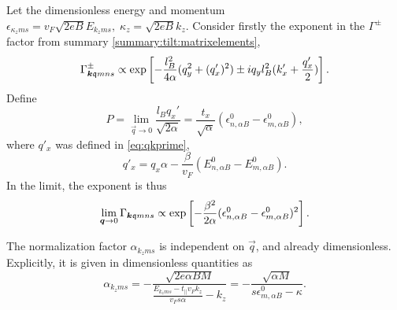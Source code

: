 Let the dimensionless energy and momentum \( \epsilon_{\kappa_z m s} = v_F \sqrt{2 e B} E_{k_{z} m s}, \; \kappa_z = \sqrt{2 e B} k_{z}  \).
Consider firstly the exponent in the \( \Gamma ^{\pm } \) factor from summary \ref{summary:tilt:matrixelements},
\[
  \Gamma^{\pm}_{\bm{k} \mathfrak{q} m n s} \propto
  \exp
  \left[
    - \frac{l_{B}^2}{4 \alpha } (q_{y}^2 + (q' _x)^2) \pm  i q_y l_B^2 (k' _x + \frac{q'_x}{2} )
  \right].
\]
Define
\begin{equation}
P = \lim_{\vec{q} \to 0} \frac{l_B q_x'}{\sqrt{2 \alpha } } = \frac{t_x}{\sqrt{\alpha}} (\epsilon^0_{n, \alpha B} - \epsilon^0_{m, \alpha B}),
\end{equation}
where \( q'_x \) was defined in \cref{eq:qkprime},
\begin{equation*}
  q' _x = q_x \alpha  - \frac{\beta}{v_{F} }( E^0_{n,\alpha B} - E^0_{m, \alpha B} ).
\end{equation*}
In the limit, the exponent is thus
\begin{equation}
  \lim_{\bm{q}\to 0} \Gamma_{\bm{k} \mathfrak{q} m n s} \propto
  \exp
  \left[
    - \frac{\beta ^2 }{2 \alpha} ( \epsilon ^0_{n,\alpha B} - \epsilon ^0_{m, \alpha B} )^2
  \right].
\end{equation}

The normalization factor \( \alpha_{k_z m s} \) is independent on \( \vec{q} \), and already dimensionless.
Explicitly, it is given in dimensionless quantities as
\begin{equation}
  \alpha_{k_z m s} =
  -\frac{\sqrt{2 e \alpha B M}}{ \frac{E_{k_{z} m s} - t_{\parallel} v_F k_z}{v_{F} s \alpha } - k_z}
  = -\frac{\sqrt{\alpha M}}{s \epsilon ^{0}_{m, \alpha B} - \kappa }.
\end{equation}

